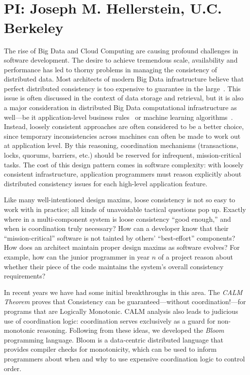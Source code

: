 % 
% 
% 
%   
\vspace{-2pt}
\section*{\mytitle\\
{\normalsize PI: Joseph M. Hellerstein, U.C. Berkeley}}
The rise of Big Data and Cloud Computing are causing profound challenges in software development.  The desire to achieve tremendous scale, availability and performance has led to thorny problems in managing the consistency of distributed data.
Most architects of modern Big Data infrastructure believe that perfect distributed consistency is too expensive to guarantee in the large~\cite{ladisreport}.  This issue is often discussed in the context of data storage and retrieval, but it is also a major consideration in distributed Big Data computational infrastructure as well---be it application-level business rules~\cite{finkelstein2011} or machine learning algorithms~\cite{hogwild}.  Instead, loosely consistent approaches are often considered to be a better choice, since temporary inconsistencies across machines can often be made to work out at application level. By this reasoning, coordination mechanisms (transactions, locks, quorums, barriers, etc.) should be reserved for infrequent, mission-critical tasks.  The cost of this design pattern comes in software complexity: with loosely consistent infrastructure, application programmers must reason explicitly about distributed consistency issues for each high-level application feature.

Like many well-intentioned design maxims, loose consistency is not so easy to work with in practice; all kinds of unavoidable tactical questions pop up.  Exactly where in a multi-component system is loose consistency ``good enough,'' and when is coordination truly necessary?  How can a developer know that their ``mission-critical'' software is not tainted by others' ``best-effort'' components?  How does an architect maintain proper design maxims as software evolves? For example, how can the junior programmer in year $n$ of a project reason about whether their piece of the code maintains the system's overall consistency requirements?

In recent years we have had some initial breakthroughs in this area.  The \emph{CALM Theorem} proves that Consistency can be guaranteed---without coordination!---for programs that are Logically Monotonic. CALM analysis also leads to judicious use of coordination logic: coordination serves exclusively as a guard for non-monotonic reasoning.  Following from these ideas, we developed the \emph{Bloom} programming language.  Bloom is a data-centric distributed language that provides compiler checks for monotonicity, which can be used to inform programmers about when and why to use expensive coordination logic to control order.

